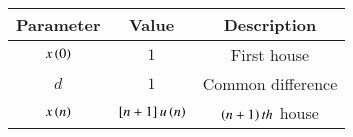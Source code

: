 \begin{tabular}{|c|c|c|}
\hline
Parameter & Value & Description \\
\hline
$x\left(0\right)$ & $1$ & First house \\
\hline
$d$ & $1$ & Common difference\\
\hline
$x\left(n\right)$ & ${}\left[n+1\right]u\left(n\right)$ & $\left(n+1\right)th$ house\\
\hline
\end{tabular}
